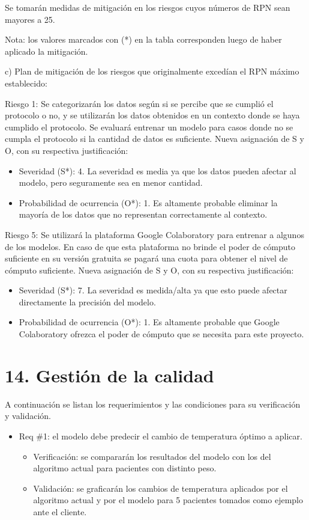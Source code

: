 \documentclass[
11pt, %
]{charter}
\begin{document}
Se tomarán medidas de mitigación en los riesgos cuyos números de RPN sean mayores a 25.

Nota: los valores marcados con (*) en la tabla corresponden luego de haber aplicado la mitigación.

c) Plan de mitigación de los riesgos que originalmente excedían el RPN máximo establecido:
 
Riesgo 1: Se categorizarán los datos según si se percibe que se cumplió el protocolo o no, y se utilizarán los datos obtenidos en un contexto donde se haya cumplido el protocolo. Se evaluará entrenar un modelo para casos donde no se cumpla el protocolo si la cantidad de datos es suficiente.
  Nueva asignación de S y O, con su respectiva justificación:
  \begin{itemize}
	\item Severidad (S*): 4.
          La severidad es media ya que los datos pueden afectar al modelo, pero seguramente sea en menor cantidad.
	\item Probabilidad de ocurrencia (O*): 1.
          Es altamente probable eliminar la mayoría de los datos que no representan correctamente al contexto.
	\end{itemize}

Riesgo 5: Se utilizará la plataforma Google Colaboratory para entrenar a algunos de los modelos. En caso de que esta plataforma no brinde el poder de cómputo suficiente en su versión gratuita se pagará una cuota para obtener el nivel de cómputo suficiente.
Nueva asignación de S y O, con su respectiva justificación:
\begin{itemize}
	\item Severidad (S*): 7.
	La severidad es medida/alta ya que esto puede afectar directamente la precisión del modelo.
	\item Probabilidad de ocurrencia (O*): 1.
	Es altamente probable que Google Colaboratory ofrezca el poder de cómputo que se necesita para este proyecto.
\end{itemize}

\section{14. Gestión de la calidad}
\label{sec:calidad}

A continuación se listan los requerimientos y las condiciones para su verificación y validación.

\begin{itemize} 
\item Req \#1: el modelo debe predecir el cambio de temperatura óptimo a aplicar.

\begin{itemize}
	\item Verificación: se compararán los resultados del modelo con los del algoritmo actual para pacientes con distinto peso.
	\item Validación: se graficarán los cambios de temperatura aplicados por el algoritmo actual y por el modelo para 5 pacientes tomados como ejemplo ante el cliente.
\end{itemize}

\end{itemize}
\end{document}
